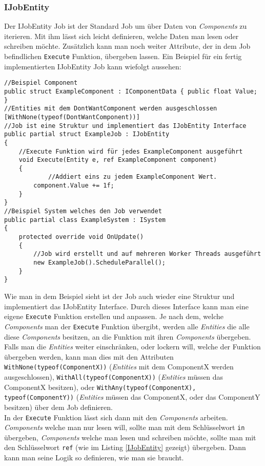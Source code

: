 \subsubsection{IJobEntity}
Der IJobEntity Job ist der Standard Job um über Daten von \textit{Components} zu iterieren. Mit ihm lässt sich leicht definieren, welche Daten man lesen oder schreiben möchte. Zusätzlich kann man noch weiter Attribute, der in dem Job befindlichen \texttt{Execute} Funktion, übergeben lassen. Ein Beispiel für ein fertig implementierten IJobEntity Job kann wiefolgt aussehen:
\begin{lstlisting}[style=code, caption={IJobEntity Beispiel}, label=IJobEntity]
//Beispiel Component
public struct ExampleComponent : IComponentData { public float Value; }
//Entities mit dem DontWantComponent werden ausgeschlossen
[WithNone(typeof(DontWantComponent))]
//Job ist eine Struktur und implementiert das IJobEntity Interface
public partial struct ExampleJob : IJobEntity
{
	//Execute Funktion wird für jedes ExampleComponent ausgeführt
    void Execute(Entity e, ref ExampleComponent component)
    {
    		//Addiert eins zu jedem ExampleComponent Wert.
        component.Value += 1f;
    }
}
//Beispiel System welches den Job verwendet
public partial class ExampleSystem : ISystem
{
    protected override void OnUpdate()
    {
        //Job wird erstellt und auf mehreren Worker Threads ausgeführt
        new ExampleJob().ScheduleParallel();
    }
}
\end{lstlisting}
Wie man in dem Beispiel sieht ist der Job auch wieder eine Struktur und implementiert das IJobEntity Interface. Durch dieses Interface kann man eine eigene \texttt{Execute} Funktion erstellen und anpassen. Je nach dem, welche \textit{Components} man der \texttt{Execute} Funktion übergibt, werden alle \textit{Entities} die alle diese  \textit{Components} besitzen, an die Funktion mit ihren \textit{Components} übergeben. Falls man die \textit{Entities} weiter einschränken, oder lockern will, welche der Funktion übergeben werden, kann man dies mit den Attributen \texttt{WithNone(typeof(ComponentX))} (\textit{Entities} mit dem ComponentX werden ausgeschlossen), \texttt{WithAll(typeof(ComponentX))} (\textit{Entities} müssen das ComponentX besitzen), oder \texttt{WithAny(typeof(ComponentX), typeof(ComponentY))} (\textit{Entities} müssen das ComponentX, oder das ComponentY besitzen) über dem Job definieren.\\
In der \texttt{Execute} Funktion lässt sich dann mit den \textit{Components} arbeiten. \textit{Components} welche man nur lesen will, sollte man mit dem Schlüsselwort \texttt{in} übergeben, \textit{Components} welche man lesen und schreiben möchte, sollte man mit den Schlüsselwort \texttt{ref} (wie im Listing \ref{IJobEntity} gezeigt) übergeben. Dann kann man seine Logik so definieren, wie man sie braucht.
